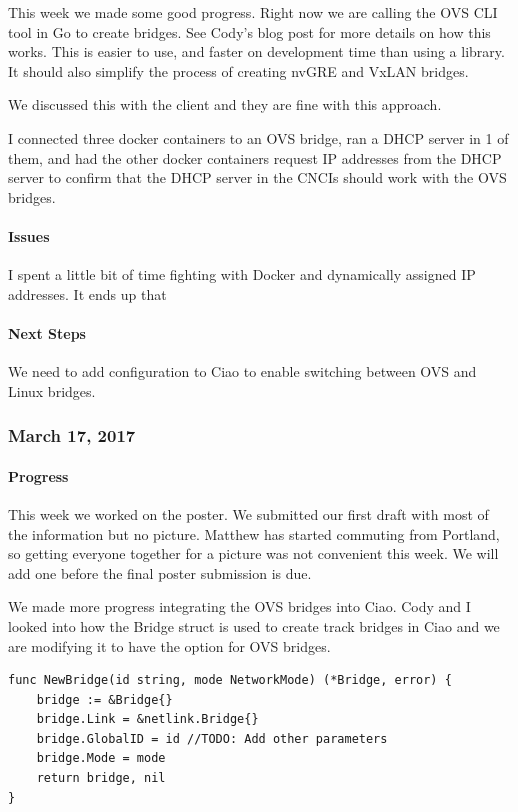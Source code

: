 \documentclass[10pt,onecolumn,journal,draftclsnofoot]{IEEEtran}
\begin{document}
This week we made some good progress. Right now we are calling the OVS
CLI tool in Go to create bridges. See Cody's blog post for more details
on how this works. This is easier to use, and faster on development time
than using a library. It should also simplify the process of creating
nvGRE and VxLAN bridges.

We discussed this with the client and they are fine with this approach.

I connected three docker containers to an OVS bridge, ran a DHCP server
in 1 of them, and had the other docker containers request IP addresses
from the DHCP server to confirm that the DHCP server in the CNCIs should
work with the OVS bridges.

\paragraph{Issues} 

I spent a little bit of time fighting with Docker and dynamically
assigned IP addresses. It ends up that

\paragraph{Next Steps} 

We need to add configuration to Ciao to enable switching between OVS and
Linux bridges.

\subsubsection{March 17, 2017} 

\paragraph{Progress} 

This week we worked on the poster. We submitted our first draft with
most of the information but no picture. Matthew has started commuting
from Portland, so getting everyone together for a picture was not
convenient this week. We will add one before the final poster submission
is due.

We made more progress integrating the OVS bridges into Ciao. Cody and I
looked into how the Bridge struct is used to create track bridges in
Ciao and we are modifying it to have the option for OVS bridges.

\begin{lstlisting}
func NewBridge(id string, mode NetworkMode) (*Bridge, error) {
    bridge := &Bridge{}
    bridge.Link = &netlink.Bridge{}
    bridge.GlobalID = id //TODO: Add other parameters
    bridge.Mode = mode
    return bridge, nil
}
\end{lstlisting}
\end{document}
